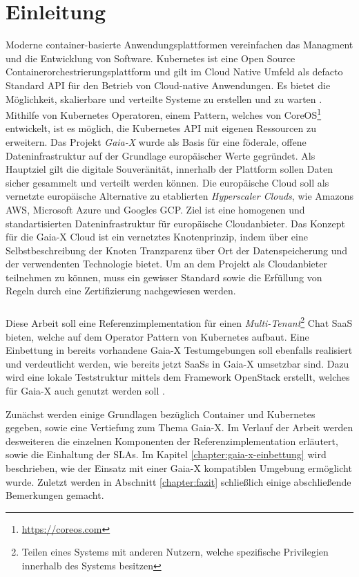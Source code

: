 \chapter{Einleitung}
\label{chap:einleitung}

Moderne container-basierte Anwendungsplattformen vereinfachen das Managment und die Entwicklung
von Software. Kubernetes \cite{kubernetes} ist eine Open Source Containerorchestrierungsplattform und gilt im
Cloud Native Umfeld als defacto Standard API für den Betrieb von Cloud-native Anwendungen.
Es bietet die Möglichkeit, skalierbare und verteilte Systeme zu erstellen und zu warten \cite{Burns2019}.
Mithilfe von Kubernetes Operatoren, einem Pattern, welches von CoreOS\footnote{\url{https://coreos.com}} entwickelt,
ist es möglich, die Kubernetes API mit eigenen Ressourcen zu erweitern.
Das Projekt \emph{Gaia-X} wurde als Basis für eine föderale, offene Dateninfrastruktur auf der Grundlage europäischer Werte gegründet.
Als Hauptziel gilt die digitale Souveränität, innerhalb der Plattform sollen Daten sicher gesammelt und verteilt werden können.
Die europäische Cloud soll als vernetzte europäische Alternative zu etablierten \emph{Hyperscaler Clouds}, wie Amazons \ac{AWS},
Microsoft Azure und Googles \ac{GCP}. Ziel ist eine homogenen und standartisierten Dateninfrastruktur für europäische Cloudanbieter.
Das Konzept für die Gaia-X Cloud ist ein vernetztes Knotenprinzip, indem über eine Selbstbeschreibung der Knoten
Tranzparenz über Ort der Datenspeicherung und der verwendenten Technologie bietet. Um an dem Projekt als Cloudanbieter
teilnehmen zu können, muss ein gewisser Standard sowie die Erfüllung von Regeln durch eine Zertifizierung nachgewiesen werden.\cite{BMWi2019}

\paragraph{}
Diese Arbeit soll eine Referenzimplementation für einen \emph{Multi-Tenant}\footnote{Teilen eines Systems mit anderen Nutzern, welche spezifische Privilegien innerhalb des Systems besitzen}
Chat \ac{SaaS} bieten, welche auf dem Operator Pattern von Kubernetes aufbaut.
Eine Einbettung in bereits vorhandene Gaia-X Testumgebungen soll ebenfalls realisiert und verdeutlicht werden,
wie bereits jetzt \acp{SaaS} in Gaia-X umsetzbar sind. Dazu wird eine lokale Teststruktur mittels dem Framework OpenStack erstellt,
welches für Gaia-X auch genutzt werden soll \cite{scs}.

Zunächst werden einige Grundlagen bezüglich Container und Kubernetes gegeben, sowie eine Vertiefung zum Thema Gaia-X.
Im Verlauf der Arbeit werden desweiteren die einzelnen Komponenten der Referenzimplementation erläutert, sowie die Einhaltung der \acp{SLA}.
Im Kapitel \ref{chapter:gaia-x-einbettung} wird beschrieben, wie der Einsatz mit einer Gaia-X kompatiblen Umgebung ermöglicht wurde.
Zuletzt werden in Abschnitt \ref{chapter:fazit} schließlich einige abschließende Bemerkungen gemacht.